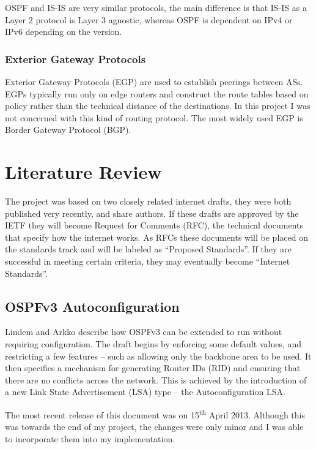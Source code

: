 OSPF and IS-IS are very similar protocols, the main difference is that IS-IS as
a Layer 2 protocol is Layer 3 agnostic, whereas OSPF is dependent on IPv4 or
IPv6 depending on the version.

\subsection{Exterior Gateway Protocols}
Exterior Gateway Protocols (EGP) 
are used to establish peerings between ASs. EGPs typically run only on edge
routers and construct the route tables based on policy rather than the
technical distance of the destinations. In this project I was not concerned
with this kind of routing protocol.  The most widely used EGP is Border
Gateway Protocol (BGP).



\chapter{Literature Review} 
The project was based on two closely related internet drafts, they were both
published very recently, and share authors. If these drafts are approved by the
IETF they will become Request for Comments (RFC), the technical documents that specify how the internet works. As RFCs
these documents will be placed on the standards track and will be labeled as
``Proposed Standards''. If they are successful in meeting certain criteria,
they may eventually become ``Internet Standards''\cite{rfc6410}.

\section{OSPFv3 Autoconfiguration}
Lindem and Arkko\cite{draft-ietf-ospf-ospfv3-autoconfig-02} describe how OSPFv3
can be extended to run without requiring configuration. The draft begins
by enforcing some default values, and restricting a few features -- such as
allowing only the backbone area to be used. It then specifies a mechanism for
generating Router IDs (RID)  and ensuring that
there are no conflicts across the network. This is achieved by the introduction
of a new Link State Advertisement (LSA)  type -- the Autoconfiguration LSA. 

The most recent release of this document was on 15\textsuperscript{th} April
2013. Although this was towards the end of my project, the changes were only
minor and I was able to incorporate them into my implementation.

